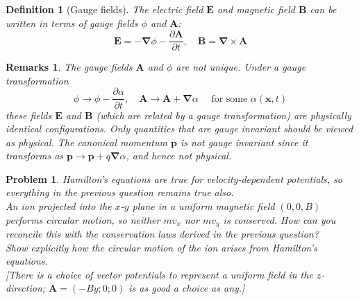 \documentclass[a4paper]{article}
\newtheorem{defi}{Definition}[section]
\newtheorem{remarks}{Remarks}[section]
\theoremstyle{new}
\newtheorem{qns}{Problem}[section]
\begin{document}
\begin{defi}[Gauge fields]
The electric field $\mathbf{E}$ and magnetic field $\mathbf{B}$ can be written in terms of gauge fields $\phi$ and $\mathbf{A}$:
$$\mathbf{E}=-\boldsymbol{\nabla}\phi-\frac{\partial\mathbf{A}}{\partial t},\quad\mathbf{B}=\boldsymbol{\nabla}\times\mathbf{A}$$
\end{defi}
\begin{remarks}
The gauge fields $\mathbf{A}$ and $\phi$ are not unique. Under a gauge transformation
$$\phi\rightarrow\phi-\frac{\partial\alpha}{\partial t},\quad\mathbf{A}\rightarrow\mathbf{A}+\boldsymbol{\nabla}\alpha\quad\text{ for some }\alpha(\mathbf{x},t)$$
these fields $\mathbf{E}$ and $\mathbf{B}$ (which are related by a gauge transformation) are physically identical configurations. Only quantities that are gauge invariant should be viewed as physical. The canonical momentum $\mathbf{p}$ is not gauge invariant since it transforms as $\mathbf{p}\rightarrow\mathbf{p}+q\boldsymbol{\nabla}\alpha$, and hence not physical.
\end{remarks}
\begin{qns}
Hamilton’s equations are true for velocity-dependent potentials, so everything in the previous question remains true also.\\[5pt]
An ion projected into the $x$-$y$ plane in a uniform magnetic field $(0, 0,B)$ performs circular motion, so neither $mv_x$ nor $mv_y$ is conserved. How can you reconcile this with the conservation laws derived in the previous question?\\[5pt]
Show explicitly how the circular motion of the ion arises from Hamilton’s equations.\\[5pt]
[There is a choice of vector potentials to represent a uniform field in the $z$-direction; $\mathbf{A} =(-By; 0; 0)$ is as good a choice as any.]
\end{qns}
\end{document}
